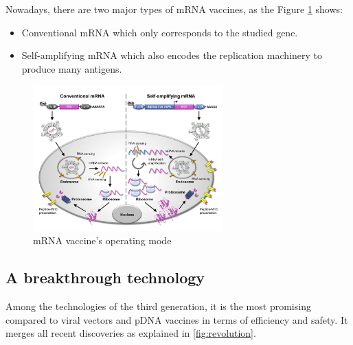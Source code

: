 \documentclass{article}
\begin{document}
            Nowadays, there are two major types of mRNA vaccines, as the Figure \ref{fig:mRNAtypesnext} shows:
            \begin{itemize}
                \item Conventional mRNA which only corresponds to the studied gene.
                \item Self-amplifying mRNA which also encodes the replication machinery to produce many antigens.
            \end{itemize}
            
            \begin{figure}
                \centering
                \includegraphics[width=0.65\textwidth]{imgs/mRNA_action.JPG}
                \caption{mRNA vaccine's operating mode \autocite{MRNATransformativeTechnology}}
                \label{fig:mRNAtypesnext}
            \end{figure}


     
        \subsection{A breakthrough technology}

            Among the technologies of the third generation, it is the most promising compared to viral vectors and pDNA vaccines in terms of efficiency and safety.
            It merges all recent discoveries as explained in \ref{fig:revolution}.
            
\end{document}
